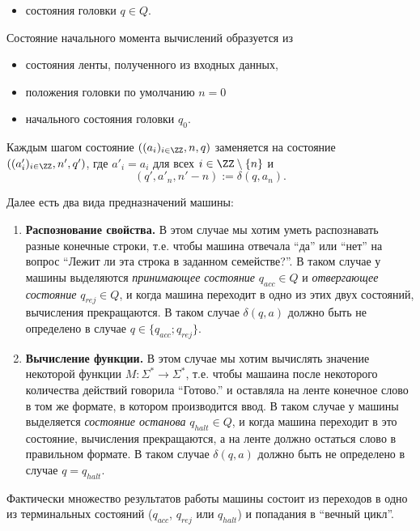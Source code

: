 \documentclass[12pt,a4paper]{article}
\begin{document}
\begin{definition}
\begin{itemize}
            \item состояния головки $q \in Q$.
        \end{itemize}
        Состояние начального момента вычислений образуется из
        \begin{itemize}
            \item состояния ленты, полученного из входных данных,
            \item положения головки по умолчанию $n = 0$
            \item начального состояния головки $q_0$.
        \end{itemize}
        Каждым шагом состояние $((a_i)_{i \in \ZZ}, n, q)$ заменяется на состояние $((a'_i)_{i \in \ZZ}, n', q')$, где $a'_i = a_i$ для всех $i \in \ZZ \setminus \{n\}$ и
        \[
            (q', a'_n, n'-n) := \delta(q, a_n).
        \]

        Далее есть два вида предназначений машины:
        \begin{enumerate}
            \item \textbf{Распознование свойства.} В этом случае мы хотим уметь распознавать разные конечные строки, т.е. чтобы машина отвечала ``да'' или ``нет'' на вопрос ``Лежит ли эта строка в заданном семействе?''. В таком случае у машины выделяются \emph{принимающее состояние} $q_{acc} \in Q$ и \emph{отвергающее состояние} $q_{rej} \in Q$, и когда машина переходит в одно из этих двух состояний, вычисления прекращаются. В таком случае $\delta(q, a)$ должно быть не определено в случае $q \in \{q_{acc}; q_{rej}\}$.
            \item \textbf{Вычисление функции.} В этом случае мы хотим вычислять значение некоторой функции $M: \Sigma^* \to \Sigma^*$, т.е. чтобы машаина после некоторого количества действий говорила ``Готово.'' и оставляла на ленте конечное слово в том же формате, в котором производится ввод. В таком случае у машины выделяется \emph{состояние останова} $q_{halt} \in Q$, и когда машина переходит в это состояние, вычисления прекращаются, а на ленте должно остаться слово в правильном формате. В таком случае $\delta(q, a)$ должно быть не определено в случае $q = q_{halt}$.
        \end{enumerate}
    \end{definition}

    \begin{remark*}
        Фактически множество результатов работы машины состоит из переходов в одно из терминальных состояний ($q_{acc}$, $q_{rej}$ или $q_{halt}$) и попадания в ``вечный цикл''.
    \end{remark*}
\end{document}
